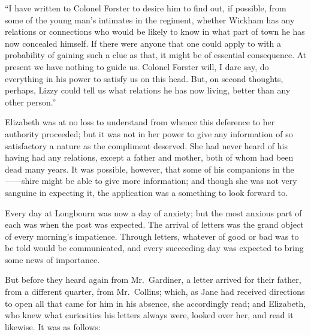 \documentclass[12pt,english]{book}
\begin{document}
{}``I have written to Colonel Forster to desire him to find out,
if possible, from some of the young man's intimates in the regiment,
whether Wickham has any relations or connections who would be likely
to know in what part of town he has now concealed himself. If there
were anyone that one could apply to with a probability of gaining
such a clue as that, it might be of essential consequence. At present
we have nothing to guide us. Colonel Forster will, I dare say, do
everything in his power to satisfy us on this head. But, on second
thoughts, perhaps, Lizzy could tell us what relations he has now living,
better than any other person.''

Elizabeth was at no loss to understand from whence this deference
to her authority proceeded; but it was not in her power to give any
information of so satisfactory a nature as the compliment deserved.
She had never heard of his having had any relations, except a father
and mother, both of whom had been dead many years. It was possible,
however, that some of his companions in the \mbox{------}shire might
be able to give more information; and though she was not very sanguine
in expecting it, the application was a something to look forward to.

Every day at Longbourn was now a day of anxiety; but the most anxious
part of each was when the post was expected. The arrival of letters
was the grand object of every morning's impatience. Through letters,
whatever of good or bad was to be told would be communicated, and
every succeeding day was expected to bring some news of importance.

But before they heard again from Mr.\ Gardiner, a letter arrived
for their father, from a different quarter, from Mr.\ Collins; which,
as Jane had received directions to open all that came for him in his
absence, she accordingly read; and Elizabeth, who knew what curiosities
his letters always were, looked over her, and read it likewise. It
was as follows:
\end{document}
